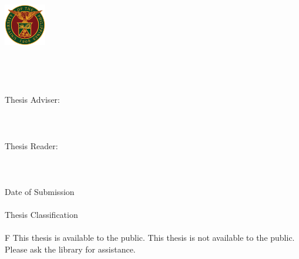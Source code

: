 \begin{titlepage}
\center
\vspace*{0.55cm}

\includegraphics[height=1.83cm]{images/up_logo.png}\\[0.6cm]

\MakeUppercase{\university}\\[1cm]

\degree\\[1.2cm]

\textbf{\student}\\
\bigskip
\thesistitle\\[1.2cm]

Thesis Adviser:\\
\bigskip
\textbf{\adviser}\\
\department\\
\university{} \campus\\[1.2cm]

Thesis Reader:\\
\bigskip
\textbf{\reader}\\
\department\\
\university{} \campus\\[1.2cm]

Date of Submission\\
\medskip
\submissiondate\\[1.2cm]

Thesis Classification\\
\medskip
\textbf{\thesisclass}\\
\medskip
\if \thesisclass F
This thesis is available to the public.
\else
This thesis is not available to the public. Please ask the library for assistance.
\fi

\end{titlepage}
